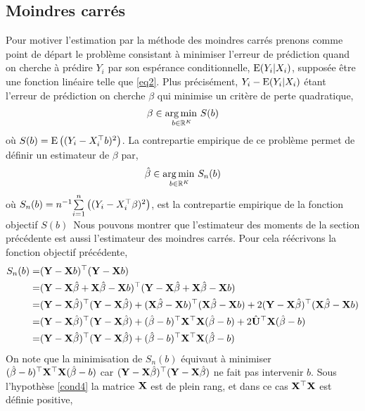 \subsection{Moindres carrés}
Pour motiver l'estimation par la méthode des moindres carrés prenons comme point de départ 
le problème consistant à minimiser l'erreur de prédiction quand on cherche 
à prédire $Y_i$ par son espérance conditionnelle, $\operatorname{E}(Y_i|X_i)$, supposée être une fonction linéaire telle que \eqref{eq2}. Plus précisément, $Y_i - \operatorname{E}(Y_i|X_i)$ étant l'erreur de prédiction  on cherche $\beta$ qui minimise un critère de perte quadratique,
\begin{align*}
\beta \in \argmin_{b\in \R^K}S(b)
\end{align*}
où $S(b) =\operatorname{E}\left((Y_i - X_i^\top b)^2\right)$.
La contrepartie empirique de ce problème permet de définir un estimateur de $\beta$ par,
\begin{align*}
\hat{\beta} \in \argmin_{b\in \R^K}S_n(b)
\end{align*}
où $S_n(b)=n^{-1}\underset{i=1}{\overset{n}{\sum}}\left((Y_i - X_i^\top\beta)^2\right)$, est la contrepartie empirique de la fonction objectif $S(b)$\
Nous pouvons montrer que l'estimateur des moments de la section précédente est aussi l'estimateur des moindres carrés. Pour cela réécrivons la fonction objectif précédente,
\begin{align*}
S_n(b) = & (\mathbf Y - \mathbf X b)^\top (\mathbf Y - \mathbf X b)\\
=&(\mathbf Y - \mathbf X \hat{\beta}+ \mathbf X \hat{\beta}  - \mathbf X b)^\top (\mathbf Y - \mathbf X \hat{\beta}+ \mathbf X \hat{\beta} - \mathbf X b)\\
=&(\mathbf Y - \mathbf X \hat{\beta})^\top(\mathbf Y - \mathbf X \hat{\beta}) +(\mathbf X \hat{\beta} - \mathbf X b)^\top (\mathbf X \hat{\beta} - \mathbf X b)+ 2(\mathbf Y-\mathbf X \hat{\beta})^\top(\mathbf X \hat{\beta}-\mathbf X b)\\
=&(\mathbf Y - \mathbf X \hat{\beta})^\top(\mathbf Y - \mathbf X \hat{\beta}) + (\hat{\beta}-b)^\top \mathbf X ^\top\mathbf X  (\hat{\beta}-b) 
+ 2\hat{\mathbf U}^\top \mathbf X (\hat{\beta}-b)\\
=&(\mathbf Y - \mathbf X \hat{\beta})^\top(\mathbf Y - \mathbf X \hat{\beta}) + (\hat{\beta}-b)^\top \mathbf X ^\top\mathbf X  (\hat{\beta}-b) 
\end{align*}
On note que la minimisation de $S_n(b)$ équivaut à minimiser $(\hat{\beta}-b)^\top \mathbf X ^\top\mathbf X  (\hat{\beta}-b)$ car $(\mathbf Y - \mathbf X \hat{\beta})^\top(\mathbf Y - \mathbf X \hat{\beta})$ ne fait pas intervenir $b$.  Sous l'hypothèse \eqref{cond4} la matrice $\mathbf X $ est de plein rang, et dans ce cas $\mathbf X ^\top\mathbf X $ est définie positive,
